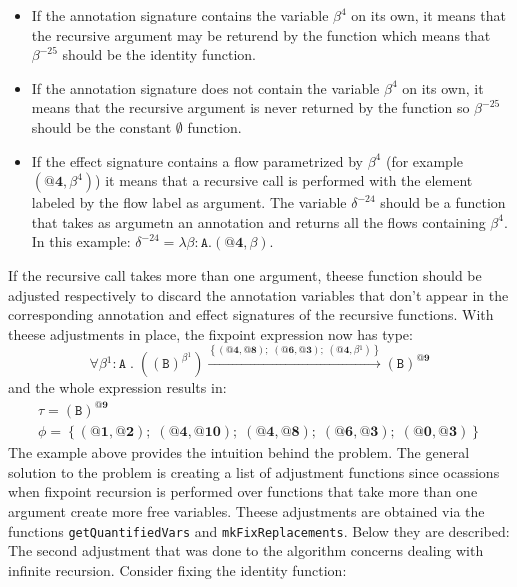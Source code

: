 \documentclass[8pt]{extarticle}
\begin{document}
\begin{itemize}
\item If the annotation signature contains the variable $\beta^{4}$ on its own, it means that the recursive argument may be returend by the function which means that $\beta^{-25}$ should be the identity function.
\item If the annotation signature does not contain the variable $\beta^{4}$ on its own, it means that the recursive argument is never returned by the function so $\beta^{-25}$ should be the constant $\emptyset$ function.
\item If the effect signature contains a flow parametrized by $\beta^{4}$ (for example $\left(\mathbf{@4},\beta^{4}\right)$) it means that a recursive call is performed with the element labeled by the flow label as argument. The variable $\delta^{-24}$ should be a function that takes as argumetn an annotation and returns all the flows containing $\beta^4$. In this example: $\delta^{-24}=\lambda\beta:\mathtt{A}.\left(\mathbf{@4},\beta\right)$.
\end{itemize}
If the recursive call takes more than one argument, theese function should be adjusted respectively to discard the annotation variables that don't appear in the corresponding annotation and effect signatures of the recursive functions. With theese adjustments in place, the fixpoint expression now has type:
\[
\forall{}\beta{}^{1}:\mathtt{A}\;{}.\;{}\left(\left(\mathtt{B}\right)^{\beta{}^{1}}\right)\xrightarrow{\left\{\left(\textbf{@4},\textbf{@8}\right);\;{}\left(\textbf{@6},\textbf{@3}\right);\;{}\left(\textbf{@4},\beta{}^{1}\right)\right\}}\left(\mathtt{B}\right)^{\textbf{@9}}
\]
and the whole expression results in:
\[
\begin{array}{c}
\tau=\left(\mathtt{B}\right)^{\textbf{@9}} \\
\phi=\left\{\left(\textbf{@1},\textbf{@2}\right);\;{}\left(\textbf{@4},\textbf{@10}\right);\;{}\left(\textbf{@4},\textbf{@8}\right);\;{}\left(\textbf{@6},\textbf{@3}\right);\;{}\left(\textbf{@0},\textbf{@3}\right)\right\}
\end{array}
\]
The example above provides the intuition behind the problem. The general solution to the problem is creating a list of adjustment functions since ocassions when fixpoint recursion is performed over functions that take more than one argument create more free variables. Theese adjustments are obtained via the functions \verb+getQuantifiedVars+ and \verb+mkFixReplacements+. Below they are described:
The second adjustment that was done to the algorithm concerns dealing with infinite recursion. Consider fixing the identity function:
\end{document}
